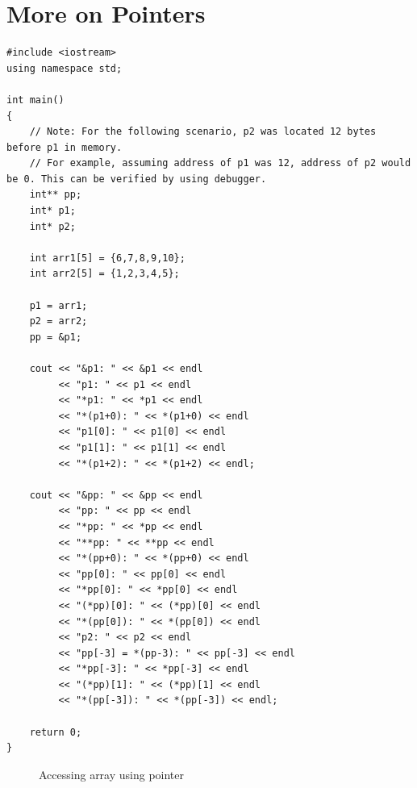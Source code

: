 \documentclass[12pt,a4paper]{article}
\begin{document}
\section{More on Pointers}
\begin{lstlisting}[caption={Pointer Example},escapechar=!]
#include <iostream>
using namespace std;

int main()
{
	// Note: For the following scenario, p2 was located 12 bytes before p1 in memory.
	// For example, assuming address of p1 was 12, address of p2 would be 0. This can be verified by using debugger.
	int** pp;
	int* p1;
	int* p2;

	int arr1[5] = {6,7,8,9,10};
	int arr2[5] = {1,2,3,4,5};

	p1 = arr1;
	p2 = arr2;
	pp = &p1;

	cout << "&p1: " << &p1 << endl
		 << "p1: " << p1 << endl
		 << "*p1: " << *p1 << endl
		 << "*(p1+0): " << *(p1+0) << endl
		 << "p1[0]: " << p1[0] << endl
		 << "p1[1]: " << p1[1] << endl
		 << "*(p1+2): " << *(p1+2) << endl;

	cout << "&pp: " << &pp << endl
		 << "pp: " << pp << endl
		 << "*pp: " << *pp << endl
		 << "**pp: " << **pp << endl
		 << "*(pp+0): " << *(pp+0) << endl
		 << "pp[0]: " << pp[0] << endl
		 << "*pp[0]: " << *pp[0] << endl
		 << "(*pp)[0]: " << (*pp)[0] << endl
		 << "*(pp[0]): " << *(pp[0]) << endl
		 << "p2: " << p2 << endl
		 << "pp[-3] = *(pp-3): " << pp[-3] << endl
		 << "*pp[-3]: " << *pp[-3] << endl
		 << "(*pp)[1]: " << (*pp)[1] << endl
		 << "*(pp[-3]): " << *(pp[-3]) << endl;

	return 0;
}
\end{lstlisting}
\begin{figure}[H]
\centering
{}
\caption{Accessing array using pointer}
\label{Accessing-Array-as-Pointer}
\end{figure}
\end{document}
